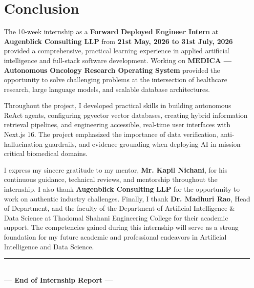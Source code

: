 \documentclass[11pt,a4paper]{article}
\begin{document}
\section{Conclusion}

The 10-week internship as a \textbf{Forward Deployed Engineer Intern} at \textbf{Augenblick Consulting LLP} from \textbf{21st May, 2026 to 31st July, 2026} provided a comprehensive, practical learning experience in applied artificial intelligence and full-stack software development. Working on \textbf{MEDICA --- Autonomous Oncology Research Operating System} provided the opportunity to solve challenging problems at the intersection of healthcare research, large language models, and scalable database architectures.

Throughout the project, I developed practical skills in building autonomous ReAct agents, configuring pgvector vector databases, creating hybrid information retrieval pipelines, and engineering accessible, real-time user interfaces with Next.js 16. The project emphasized the importance of data verification, anti-hallucination guardrails, and evidence-grounding when deploying AI in mission-critical biomedical domains.

I express my sincere gratitude to my mentor, \textbf{Mr. Kapil Nichani}, for his continuous guidance, technical reviews, and mentorship throughout the internship. I also thank \textbf{Augenblick Consulting LLP} for the opportunity to work on authentic industry challenges. Finally, I thank \textbf{Dr. Madhuri Rao}, Head of Department, and the faculty of the Department of Artificial Intelligence \& Data Science at Thadomal Shahani Engineering College for their academic support. The competencies gained during this internship will serve as a strong foundation for my future academic and professional endeavors in Artificial Intelligence and Data Science.

\vspace{0.8cm}
\begin{center}
    \rule{0.6\linewidth}{0.4pt}\\[0.2cm]
    \textbf{--- End of Internship Report ---}
\end{center}
\end{document}
